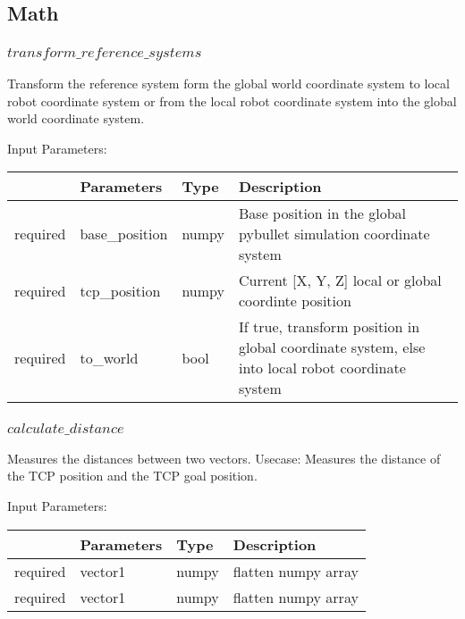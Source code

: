 \documentclass[
	ngerman,
	accentcolor=9c,%
	type=intern,
	marginpar=false
	]{tudapub}
\begin{document}
\subsection{Math}

\subsubsection{$transform\_reference\_systems$}
\noindent Transform the reference system form the global world coordinate system to local robot coordinate system or from the local robot coordinate system into the global world coordinate system.

\vspace{0.5cm}
\noindent Input Parameters:
\vspace{0.5cm}


\begin{tabular}{|p{}|p{}|p{}| p{}|}
\hline
 & \textbf{Parameters} & \textbf{Type} & \textbf{Description} \\
\hline
required & base\_position & numpy & Base position in the global pybullet simulation coordinate system \\
\hline
required & tcp\_position & numpy & Current [X, Y, Z] local or global coordinte position \\
\hline
required & to\_world & bool & If true, transform position in global coordinate system, else into local robot coordinate system \\
\hline
\end{tabular}
\vspace{1cm}

\subsubsection{$calculate\_distance$}
\noindent Measures the distances between two vectors. Usecase: Measures the distance of the TCP position and the  TCP goal position. 

\vspace{0.5cm}
\noindent Input Parameters:
\vspace{0.5cm}

\begin{tabular}{|p{}|p{}|p{}| p{}|}
\hline
 & \textbf{Parameters} & \textbf{Type} & \textbf{Description} \\
\hline
required & vector1 & numpy & flatten numpy array \\
\hline
required & vector1 & numpy & flatten numpy array \\
\hline
\end{tabular}
\vspace{1cm}
\end{document}
